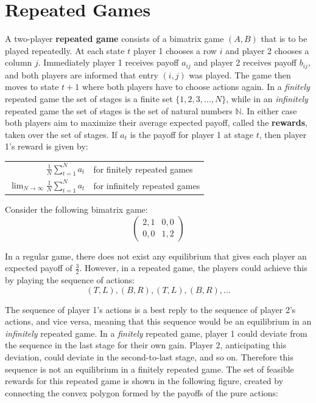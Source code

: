 \documentclass[12pt]{article}
\begin{document}
%
%
\newpage
\section{Repeated Games}
A two-player \textbf{repeated game} consists of a bimatrix game $(A, B)$ that is to be played repeatedly.
At each state $t$ player 1 chooses a row $i$ and player 2 chooses a column $j$.
Immediately player 1 receives payoff $a_{ij}$ and player 2 receives payoff $b_{ij}$, and both players are informed that entry $(i, j)$ was played.
The game then moves to state $t + 1$ where both players have to choose actions again.
In a \textit{finitely} repeated game the set of stages is a finite set $\{ 1, 2, 3, ... , N \}$, while in an \textit{infinitely} repeated game the set of stages is the set of natural numbers $\mathbb{N}$.
In either case both players aim to maximize their average expected payoff, called the \textbf{rewards}, taken over the set of stages.
If $a_t$ is the payoff for player 1 at stage $t$, then player 1's reward is given by:

\begin{table}[h]
    \centering
    \begin{tabular}{rl}
        $\displaystyle \frac{1}{N} \sum_{t = 1}^{N} a_t$ \hspace{1cm} & for finitely repeated games \\
        $\displaystyle \lim_{N \to \infty} \frac{1}{N} \sum_{t = 1}^{N} a_t$ \hspace{1cm} & for infinitely repeated games
    \end{tabular}
\end{table}

\noindent
Consider the following bimatrix game:
\[ \begin{pmatrix}
    2,1 & 0,0 \\
    0,0 & 1,2
\end{pmatrix} \]

\noindent
In a regular game, there does not exist any equilibrium that gives each player an expected payoff of $\frac{3}{2}$.
However, in a repeated game, the players could achieve this by playing the sequence of actions:
\[ (T, L), (B, R), (T, L), (B, R), ... \]

\noindent
The sequence of player 1's actions is a best reply to the sequence of player 2's actions, and vice versa, meaning that this sequence would be an equilibrium in an \textit{infinitely} repeated game.
In a \textit{finitely} repeated game, player 1 could deviate from the sequence in the last stage for their own gain. Player 2, anticipating this deviation, could deviate in the second-to-last stage, and so on.
Therefore this sequence is not an equilibrium in a finitely repeated game.
The set of feasible rewards for this repeated game is shown in the following figure, created by connecting the convex polygon formed by the payoffs of the pure actions:
\end{document}
